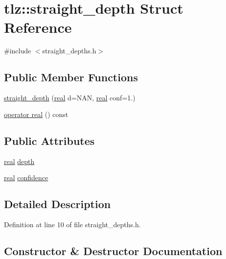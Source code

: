 \hypertarget{structtlz_1_1straight__depth}{}\section{tlz\+:\+:straight\+\_\+depth Struct Reference}
\label{structtlz_1_1straight__depth}


{\ttfamily \#include $<$straight\+\_\+depths.\+h$>$}

\subsection*{Public Member Functions}
\begin{DoxyCompactItemize}
\item 
\hyperlink{structtlz_1_1straight__depth_a8d35a0d4322e3b81dcd56b0920f136a2}{straight\+\_\+depth} (\hyperlink{namespacetlz_a15fd37cce97f2b8b606af18c2615f602}{real} d=N\+AN, \hyperlink{namespacetlz_a15fd37cce97f2b8b606af18c2615f602}{real} conf=1.)
\item 
\hyperlink{structtlz_1_1straight__depth_a110a722d4afad0b37f11d9dc27b449f1}{operator real} () const 
\end{DoxyCompactItemize}
\subsection*{Public Attributes}
\begin{DoxyCompactItemize}
\item 
\hyperlink{namespacetlz_a15fd37cce97f2b8b606af18c2615f602}{real} \hyperlink{structtlz_1_1straight__depth_a7f8f491d5607692e32111b7f6a57b01f}{depth}
\item 
\hyperlink{namespacetlz_a15fd37cce97f2b8b606af18c2615f602}{real} \hyperlink{structtlz_1_1straight__depth_a4ba5f192be0e4ca1563c1f6c615ea406}{confidence}
\end{DoxyCompactItemize}


\subsection{Detailed Description}


Definition at line 10 of file straight\+\_\+depths.\+h.



\subsection{Constructor \& Destructor Documentation}
